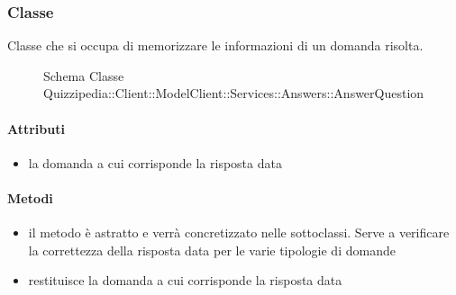 \subsubsection{Classe }
Classe che si occupa di memorizzare le informazioni di un domanda risolta.
\begin{figure}[H]
\centering
\noindent{}
\caption[Schema Classe AnswerQuestion]{Schema Classe Quizzipedia::Client::ModelClient::Services::Answers::AnswerQuestion}
\end{figure}
\paragraph{Attributi}
\begin{itemize}
\item {}
\newline
la domanda a cui corrisponde la risposta data
\end{itemize}
\paragraph{Metodi}
\begin{itemize}
\item {}
\newline
il metodo è astratto e verrà concretizzato nelle sottoclassi. Serve a verificare la correttezza della risposta data per le varie tipologie di domande
\newline
\item {}
\newline
restituisce la domanda a cui corrisponde la risposta data
\newline
\end{itemize}
